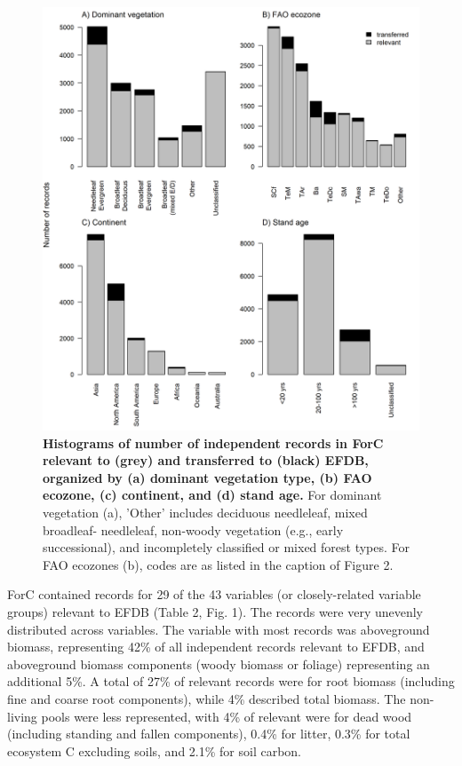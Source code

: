 \documentclass[, manuscript]{copernicus}
\begin{document}
\newpage
\begin{figure}
\includegraphics[width=15cm]{figures_tables/Histogram_n_Relevant_and_Transferred_Records} \caption{\textbf{Histograms of number of independent records in ForC relevant to (grey) and transferred to (black) EFDB, organized by (a) dominant vegetation type, (b) FAO ecozone, (c) continent, and (d) stand age.} For dominant vegetation (a), 'Other' includes deciduous needleleaf, mixed broadleaf- needleleaf, non-woody vegetation (e.g., early successional), and incompletely classified or mixed forest types. For FAO ecozones (b), codes are as listed in the caption of Figure 2.}\label{fig:fig_histograms}
\end{figure}

ForC contained records for 29 of the 43 variables (or closely-related
variable groups) relevant to EFDB (Table 2, Fig. 1). The records were
very unevenly distributed across variables. The variable with most
records was aboveground biomass, representing 42\% of all independent
records relevant to EFDB, and aboveground biomass components (woody
biomass or foliage) representing an additional 5\%. A total of 27\% of
relevant records were for root biomass (including fine and coarse root
components), while 4\% described total biomass. The non-living pools
were less represented, with 4\% of relevant were for dead wood
(including standing and fallen components), 0.4\% for litter, 0.3\% for
total ecosystem C excluding soils, and 2.1\% for soil carbon.
\end{document}
